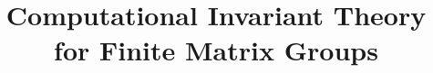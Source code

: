 

\newcommand{\varlogo}{opening/Logo_FIM_farbig_EN.pdf_tex}
\newcommand{\vartitle}{Computational Invariant Theory for Finite Matrix Groups}
\newcommand{\vartype}{Bachelor Thesis}
\newcommand{\varauthor}{Bernhard Andraschko}
\newcommand{\varsupervisor}{Prof.~Dr.~Martin Kreuzer}
\newcommand{\varinstitute}{Chair of Symbolic Computation}
\newcommand{\vardate}{July 29, 2020}
\title{\vartitle}











\clearpage

% 

\clearpage

\pagestyle{empty}
\tableofcontents

\clearpage
\pagestyle{fancy}


\clearpage

% 

\newpage
{}



\newpage

\appendix

\clearpage

% 

